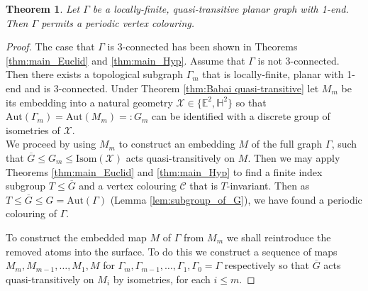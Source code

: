 \documentclass{article}
\numberwithin{equation}{section}
\newcommand{\EE}{\mathbb{E}}
\newcommand{\HH}{\mathbb{H}}
\newtheorem{theorem}[lemma]{Theorem}
\theoremstyle{definition}
\theoremstyle{remark}
\begin{document}
\begin{theorem}\label{thm:big_thm_graph_permit_col}
    Let $\Gamma$ be a locally-finite, quasi-transitive planar graph with 1-end. Then $\Gamma$ permits a periodic vertex colouring.
\end{theorem}
\begin{proof}
    The case that $\Gamma$ is 3-connected has been shown in Theorems \ref{thm:main_Euclid} and \ref{thm:main_Hyp}. Assume that $\Gamma$ is not 3-connected. Then there exists a topological subgraph $\Gamma_m$ that is locally-finite, planar with 1-end and is 3-connected. Under Theorem \ref{thm:Babai quasi-transitive} let $M_m$ be its embedding into a natural geometry $\mathcal{X}\in\{\EE^2,\HH^2\}$ so that $\text{Aut}(\Gamma_m)=\text{Aut}(M_m)=:G_m$ can be identified with a discrete group of isometries of $\mathcal{X}$.\\
    We proceed by using $M_m$ to construct an embedding $M$ of the full graph $\Gamma$, such that $\overline{G}\leq G_m\leq \text{Isom}(\mathcal{X})$ acts quasi-transitively on $M$. Then we may apply Theorems \ref{thm:main_Euclid} and \ref{thm:main_Hyp} to find a finite index subgroup $T\leq \overline{G}$ and a vertex colouring $\mathcal{C}$ that is $T$-invariant.
    Then as $T\leq\overline{G}\leq G=\text{Aut}(\Gamma)$ (Lemma \ref{lem:subgroup_of_G}), we have found a periodic colouring of $\Gamma$.

    To construct the embedded map $M$ of $\Gamma$ from $M_m$ we shall reintroduce the removed atoms into the surface. To do this we construct a sequence of maps $M_m,M_{m-1},\ldots, M_1,M$ for $\Gamma_m,\Gamma_{m-1},\ldots, \Gamma_1,\Gamma_0=\Gamma$ respectively so that $\overline{G}$ acts quasi-transitively on $M_i$ by isometries, for each $i\leq m$. 


\end{proof}
\end{document}
